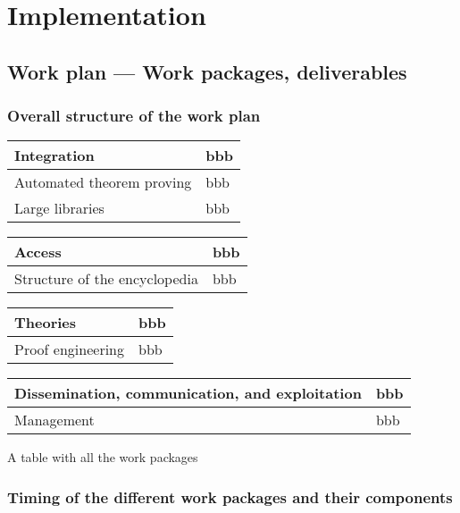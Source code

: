 \chapter{Implementation}\label{chap:implementation}

\section{Work plan --- Work packages, deliverables}

\subsection{Overall structure of the work plan}

\begin{longtable}{|p{}|p{}|}
\hline
Integration & bbb\\
\hline
Automated theorem proving & bbb\\
\hline
Large libraries & bbb\\
\hline
\end{longtable}

\begin{longtable}{|p{}|p{}|}
\hline
Access & bbb\\
\hline
Structure of the encyclopedia & bbb\\
\hline
\end{longtable}

\begin{longtable}{|p{}|p{}|}
\hline
Theories & bbb\\
\hline
Proof engineering & bbb\\
\hline
\end{longtable}

\begin{longtable}{|p{}|p{}|}
\hline
Dissemination, communication, and exploitation & bbb\\
\hline
Management & bbb\\
\hline


\end{longtable}

A table with all the work packages

\subsection{Timing of the different work packages and their components}

